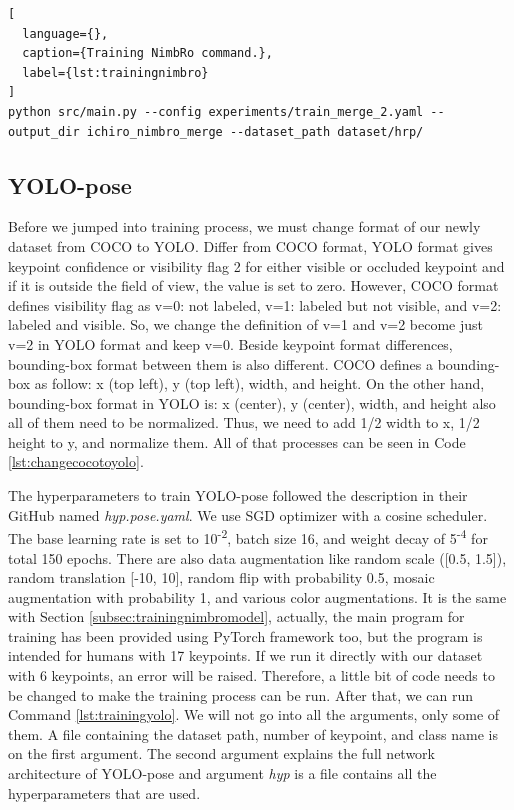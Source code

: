 \begin{lstlisting}[
  language={},
  caption={Training NimbRo command.},
  label={lst:trainingnimbro}
]
python src/main.py --config experiments/train_merge_2.yaml --output_dir ichiro_nimbro_merge --dataset_path dataset/hrp/
\end{lstlisting}



\subsection{YOLO-pose}
\label{subsec:trainingyolopose}

Before we jumped into training process, we must change format of our newly dataset from COCO to YOLO. Differ from COCO format, YOLO format gives keypoint confidence or visibility flag 2 for either visible or occluded keypoint
and if it is outside the field of view, the value is set to zero. However, COCO format defines visibility flag as v=0: not labeled, v=1: labeled but not visible, and v=2: labeled and visible. So, we change the definition of
v=1 and v=2 become just v=2 in YOLO format and keep v=0.
Beside keypoint format differences, bounding-box format between them is also different. COCO defines a bounding-box as follow: x (top left), y (top left), width, and height. On the other hand,
bounding-box format in YOLO is: x (center), y (center), width, and height also all of them need to be normalized. Thus, we need to add 1/2 width to x, 1/2 height to y, and normalize them.
All of that processes can be seen in Code \ref{lst:changecocotoyolo}. 



The hyperparameters to train YOLO-pose followed the description in their GitHub named \emph{hyp.pose.yaml}.
We use SGD optimizer with a cosine scheduler. The base learning rate is set to 10\textsuperscript{-2}, batch size 16,
and weight decay of 5\textsuperscript{-4} for total 150 epochs. There are also data augmentation like random scale ([0.5, 1.5]),
random translation [-10, 10], random flip with probability 0.5, mosaic augmentation with probability 1, and various color augmentations.
It is the same with Section \ref{subsec:trainingnimbromodel}, actually, the main program for training has been provided using PyTorch framework too, but the program is intended for humans with 17 keypoints.
If we run it directly with our dataset with 6 keypoints, an error will be raised. Therefore, a little bit of code needs to be changed to make the training process can be run.
After that, we can run Command \ref{lst:trainingyolo}. We will not go into all the arguments, only some of them. 
A file containing the dataset path, number of keypoint, and class name is on the first argument. The second argument explains the full network architecture of YOLO-pose and 
argument \emph{hyp} is a file contains all the hyperparameters that are used.

